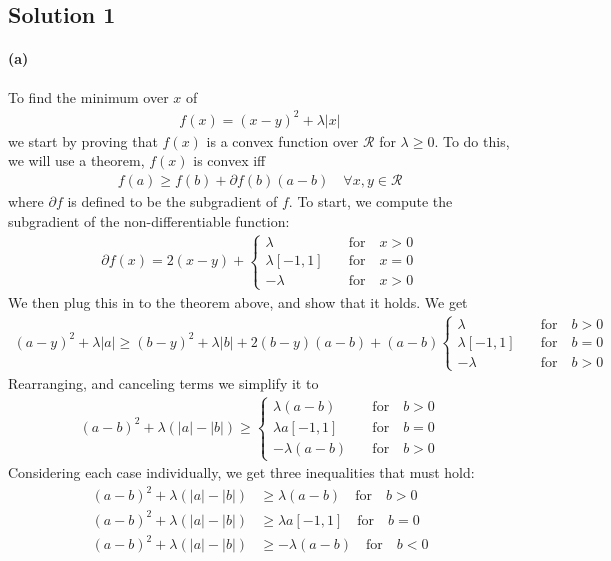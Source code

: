 \documentclass{article}
\newcommand{\solution}[1]{\clearpage \subsection*{Solution #1}}
\newcommand{\spart}[1]{\paragraph{(#1)}}
\begin{document}

\solution{1} 

\spart{a} To find the minimum over $x$ of 
\begin{align}
	f(x) = (x-y)^2+\lambda|x|
\end{align}
we start by proving that $f(x)$ is a convex function over $\mathcal{R}$ for $\lambda\geq0$. To do this, we will use a theorem, $f(x)$ is convex iff 
\begin{align}
	f(a) \geq f(b) + \partial f(b)(a-b) \quad \forall x,y \in \mathcal{R}
\end{align}
where $\partial f$ is defined to be the subgradient of $f$. To start, we compute the subgradient of the non-differentiable function:
\begin{align}
	\partial f(x) = 2(x-y) + \begin{cases}
		\lambda \quad &\text{for} \quad x>0 \\
		\lambda [-1,1] \quad &\text{for} \quad  x=0 \\
		-\lambda \quad &\text{for} \quad  x>0
	\end{cases} 
\end{align}
We then plug this in to the theorem above, and show that it holds. We get
\begin{align}
	(a-y)^2+\lambda|a| \geq (b-y)^2+\lambda|b| + 2(b-y)(a-b) + (a-b) \begin{cases}
		\lambda \quad &\text{for} \quad b>0 \\
		\lambda [-1,1] \quad &\text{for} \quad  b=0 \\
		-\lambda \quad &\text{for} \quad  b>0
	\end{cases} 
\end{align}
Rearranging, and canceling terms we simplify it to
\begin{align}
	(a-b)^2+\lambda(|a|-|b|) \geq \begin{cases}
	\lambda(a-b) \quad &\text{for} \quad b>0 \\
	\lambda a [-1,1] \quad &\text{for} \quad  b=0 \\
	-\lambda (a-b) \quad &\text{for} \quad  b>0
\end{cases} 
\end{align}
Considering each case individually, we get three inequalities that must hold: 
\begin{align}
	(a-b)^2+\lambda(|a|-|b|) &\geq \lambda(a-b) \quad \text{for} \quad b>0\\
	(a-b)^2+\lambda(|a|-|b|) &\geq \lambda a [-1,1] \quad \text{for} \quad b=0\\
	(a-b)^2+\lambda(|a|-|b|) &\geq -\lambda(a-b) \quad \text{for} \quad b<0
\end{align}
\end{document}
